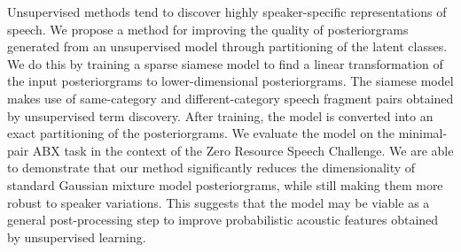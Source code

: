 Unsupervised methods tend to discover highly speaker-specific representations of speech.
We propose a method for improving the quality of posteriorgrams generated from an unsupervised model through partitioning of the latent classes.
We do this by training a sparse siamese model to find a linear transformation of the input posteriorgrams to lower-dimensional posteriorgrams.
The siamese model makes use of same-category and different-category speech fragment pairs obtained by unsupervised term discovery.
After training, the model is converted into an exact partitioning of the posteriorgrams.
We evaluate the model on the minimal-pair ABX task in the context of the Zero Resource Speech Challenge.
We are able to demonstrate that our method significantly reduces the dimensionality of standard Gaussian mixture model posteriorgrams, while still making them more robust to speaker variations.
This suggests that the model may be viable as a general post-processing step to improve probabilistic acoustic features obtained by unsupervised learning.

